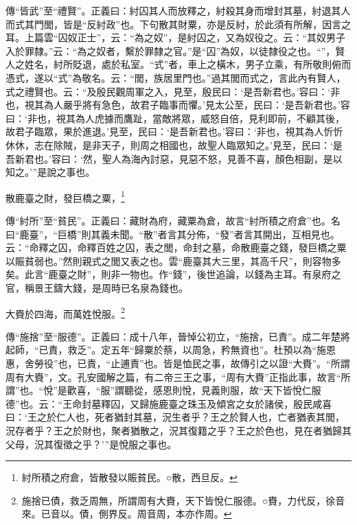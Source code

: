 {\noindent\zhuan{}\fzbyks 傳“皆武”至“禮賢”。正義曰：紂囚其人而放釋之，紂殺其身而增封其墓，紂退其人而式其門閭，皆是“反紂政”也。下句散其財粟，亦是反紂，於此須有所解，因言之耳。上篇雲“囚奴正士”，云：“為之奴”，是紂囚之，又為奴役之。云：“其奴男子入於罪隸。”云：“為之奴者，繫於罪隸之官。”是“囚”為奴，以徒隸役之也。“”，賢人之姓名，紂所貶退，處於私室。“式”者，車上之橫木，男子立乘，有所敬則俯而憑式，遂以“式”為敬名。云：“閭，族居里門也。”過其閭而式之，言此內有賢人，式之禮賢也。云：“及殷民觀周軍之入，見至，殷民曰：‘是吾新君也。’容曰：‘非也，視其為人嚴乎將有急色，故君子臨事而懼。’見太公至，民曰：‘是吾新君也。’容曰：‘非也，視其為人虎據而鷹趾，當敵將眾，威怒自倍，見利即前，不顧其後，故君子臨眾，果於進退。’見至，民曰：‘是吾新君也。’容曰：‘非也，視其為人忻忻休休，志在除賊，是非天子，則周之相國也，故聖人臨眾知之。’見至，民曰：‘是吾新君也。’容曰：‘然，聖人為海內討惡，見惡不怒，見善不喜，顏色相副，是以知之。’”是說之事也。 \par}

散鹿臺之財，發巨橋之粟，\footnote{紂所積之府倉，皆散發以賑貧民。○散，西旦反。}

{\noindent\zhuan{}\fzbyks 傳“紂所”至“貧民”。正義曰：藏財為府，藏粟為倉，故言“紂所積之府倉”也。名曰“鹿臺”，“巨橋”則其義未聞。“散”者言其分佈，“發”者言其開出，互相見也。云：“命釋之囚，命釋百姓之囚，表之閭，命封之墓，命散鹿臺之錢，發巨橋之粟以賑貧弱也。”然則親式之閭又表之也。雲“鹿臺其大三里，其高千尺”，則容物多矣。此言“鹿臺之財”，則非一物也。作“錢”，後世追論，以錢為主耳。有泉府之官，稱景王鑄大錢，是周時已名泉為錢也。 \par}

大賚於四海，而萬姓悅服。\footnote{施捨已債，救乏周無，所謂周有大賚，天下皆悅仁服德。○賚，力代反，徐音來。已音以。債，側界反。周音周，本亦作周。}

{\noindent\zhuan{}\fzbyks 傳“施捨”至“服德”。正義曰：成十八年，晉悼公初立，“施捨，已責”。成二年楚將起師，“已責，救乏”。定五年“歸粟於蔡，以周急，矜無資也”。杜預以為“施恩惠，舍勞役”也，已責，“止逋責”也。皆是恤民之事，故傳引之以證“大賚”。“所謂周有大賚”，文。孔安國解之篇，有二帝三王之事，“周有大賚”正指此事，故言“所謂”也。“悅”是歡喜，“服”謂聽從，感恩則悅，見義則服，故“天下皆悅仁服德”也。云：“王命封墓釋囚，又歸施鹿臺之珠玉及傾宮之女於諸侯，殷民咸喜曰：‘王之於仁人也，死者猶封其墓，況生者乎？王之於賢人也，亡者猶表其閭，況存者乎？王之於財也，聚者猶散之，況其復籍之乎？王之於色也，見在者猶歸其父母，況其復徵之乎？’”是悅服之事也。 \par}

